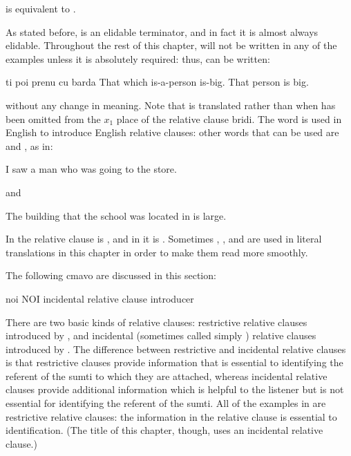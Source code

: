 {\noindent}is equivalent to . 

As stated before,  is an elidable terminator, and in
    fact it is almost always elidable. Throughout the rest of this
    chapter,  will not be written in any of the examples
    unless it is absolutely required: thus,  can be written:
\begin{example}
ti poi prenu cu barda\n
That which is-a-person is-big.\n
That person is big.
\end{example}

{\noindent}without any change in meaning. Note that  is translated
     rather than  when  has been
    omitted from the $x_1$ place of the relative clause bridi. The
    word  is used in English to introduce English relative
    clauses: other words that can be used are  and ,
    as in:
\begin{example}
I saw a man who was going to the store.
\end{example}

{\noindent}and
\begin{example}
The building that the school was located in is large.
\end{example}

In  the relative clause is
    , and in  it is . Sometimes
    , , and  are used in literal
    translations in this chapter in order to make them read more
    smoothly.



The following cmavo are discussed in this section:

   noi NOI incidental relative clause introducer

There are two basic kinds of relative clauses: restrictive
    relative clauses introduced by , and incidental
    (sometimes called simply ) relative clauses
    introduced by . The difference between restrictive and
    incidental relative clauses is that restrictive clauses provide
    information that is essential to identifying the referent of
    the sumti to which they are attached, whereas incidental
    relative clauses provide additional information which is
    helpful to the listener but is not essential for identifying
    the referent of the sumti. All of the examples in  are restrictive relative clauses: the
    information in the relative clause is essential to
    identification. (The title of this chapter, though, uses an
    incidental relative clause.) 

